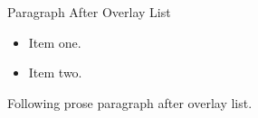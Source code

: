 \documentclass[14pt,t]{beamer}
\begin{document}
\begin{frame}{Paragraph After Overlay List}
\begin{itemize}
\item<1-> Item one.
\item<2-> Item two.
\end{itemize}
Following prose paragraph after overlay list.
\end{frame}
\end{document}

